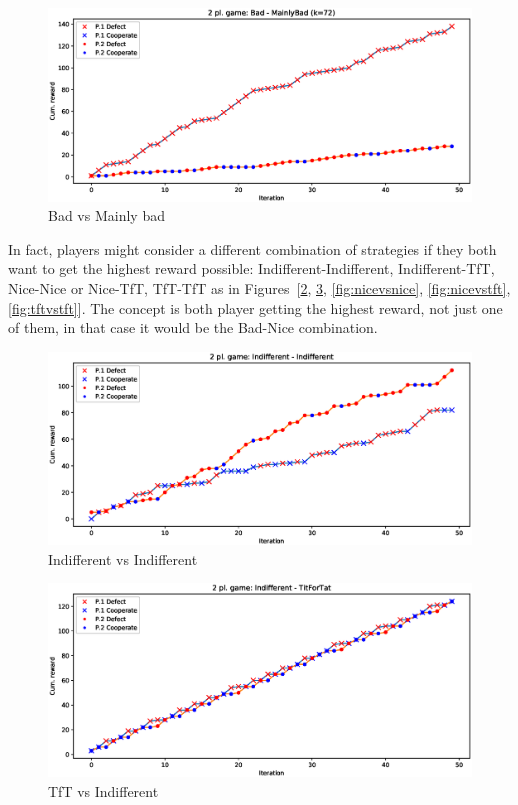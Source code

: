 \documentclass[journal,a4paper,10pt,twoside]{IEEEtran} %
\begin{document}
\begin{figure}[ht]
    \centering
    \includegraphics[width=1\columnwidth]{../img/ipd2p/ipd2p-rewards-Bad-MainlyBad(k=72)}
    \caption{Bad vs Mainly bad}
    \label{fig:badvsmainlybad}
\end{figure}

In fact, players might consider a different combination of strategies if they both want to get the highest reward possible: Indifferent-Indifferent, Indifferent-TfT, Nice-Nice or Nice-TfT, TfT-TfT as in Figures~[\ref{fig:indiffvsindiff}, \ref{fig:tftvsindiff}, \ref{fig:nicevsnice}, \ref{fig:nicevstft}, \ref{fig:tftvstft}]. The concept is both player getting the highest reward, not just one of them, in that case it would be the Bad-Nice combination.

\begin{figure}[ht]
    \centering
    \includegraphics[width=1\columnwidth]{../img/ipd2p/ipd2p-rewards-Indifferent-Indifferent}
    \caption{Indifferent vs Indifferent}
    \label{fig:indiffvsindiff}
\end{figure}

\begin{figure}[ht]
    \centering
    \includegraphics[width=1\columnwidth]{../img/ipd2p/ipd2p-rewards-Indifferent-TitForTat}
    \caption{TfT vs Indifferent}
    \label{fig:tftvsindiff}
\end{figure}
\end{document}
